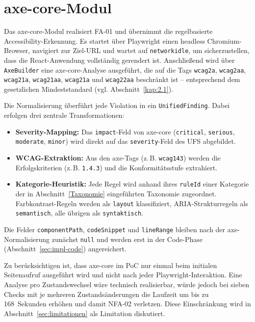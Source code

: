 \section{axe-core-Modul}
\label{sec:impl-axe}

Das axe-core-Modul realisiert \ac{FA}-01 und übernimmt die regelbasierte Accessibility-Erkennung. Es startet über Playwright einen headless Chromium-Browser, navigiert zur Ziel-\acs{URL} und wartet auf \texttt{networkidle}, um sicherzustellen, dass die React-Anwendung vollständig gerendert ist. Anschließend wird über \texttt{AxeBuilder} eine axe-core-Analyse ausgeführt, die auf die Tags \texttt{wcag2a}, \texttt{wcag2aa}, \texttt{wcag21a}, \texttt{wcag21aa}, \texttt{wcag21a} und \texttt{wcag22aa} beschränkt ist -- entsprechend dem gesetzlichen Mindeststandard (vgl. Abschnitt~\ref{kap:2.1}).

Die Normalisierung überführt jede Violation in ein \texttt{UnifiedFinding}. Dabei erfolgen drei zentrale Transformationen:

\begin{itemize}
  \item \textbf{Severity-Mapping:} Das \texttt{impact}-Feld von axe-core (\texttt{critical}, \texttt{serious}, \texttt{moderate}, \texttt{minor}) wird direkt auf das \texttt{severity}-Feld des \ac{UFS} abgebildet.
  \item \textbf{\ac{WCAG}-Extraktion:} Aus den axe-Tags (z.\,B. \texttt{wcag143}) werden die Erfolgskriterien (z.\,B. \texttt{1.4.3}) und die Konformitätsstufe extrahiert.
  \item \textbf{Kategorie-Heuristik:} Jede Regel wird anhand ihres \texttt{ruleId} einer Kategorie der in Abschnitt~\ref{Taxonomie} eingeführten Taxonomie zugeordnet. Farbkontrast-Regeln werden als \texttt{layout} klassifiziert, ARIA-Strukturregeln als \texttt{semantisch}, alle übrigen als \texttt{syntaktisch}.
\end{itemize}

Die Felder \texttt{componentPath}, \texttt{codeSnippet} und \texttt{lineRange} bleiben nach der axe-Normalisierung zunächst \texttt{null} und werden erst in der Code-Phase (Abschnitt~\ref{sec:impl-code}) angereichert.

Zu berücksichtigen ist, dass axe-core im \ac{PoC} nur einmal beim initialen Seitenaufruf ausgeführt wird und nicht nach jeder Playwright-Interaktion. Eine Analyse pro Zustandswechsel wäre technisch realisierbar, würde jedoch bei sieben Checks mit je mehreren Zustandsänderungen die Laufzeit um bis zu 168~Sekunden erhöhen und damit \ac{NFA}-02 verletzen. Diese Einschränkung wird in Abschnitt~\ref{sec:limitationen} als Limitation diskutiert.

